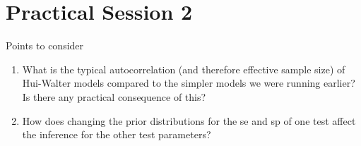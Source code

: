\documentclass[
  ignorenonframetext,
  aspectratio=169,
]{beamer}
\begin{document}
\hypertarget{practical-session-2}{%
\section{Practical Session 2}\label{practical-session-2}}

\begin{frame}[fragile]{Points to consider}
\protect\hypertarget{points-to-consider}{}
\begin{enumerate}
\item
  What is the typical autocorrelation (and therefore effective sample
  size) of Hui-Walter models compared to the simpler models we were
  running earlier? Is there any practical consequence of this?
\item
  How does changing the prior distributions for the se and sp of one
  test affect the inference for the other test parameters?
\end{enumerate}

\begin{comment}


## Exercise 1 {.fragile}

Simulate some data using the code given above (under "Analysing simulated data"), and run it using the following model with truncated Beta(1,1) priors for sensitivity and specificity of both tests:

\scriptsize\normalsize

What are the results?

### Solution 1 {.fragile}

\scriptsize

```r
prev <- list(chain1=0.05, chain2=0.95)
se <- list(chain1=c(0.5,0.99), chain2=c(0.99,0.5))
sp <- list(chain1=c(0.5,0.99), chain2=c(0.99,0.5))

results_tr_1000 <- run.jags('hw_truncated.txt', n.chains=2, sample=10000)

# Note: this is only commented out to save space in the exercise file!
# plot(results_tr_1000)
# check convergence and effective sample size, and then interpret results:
results_tr_1000
```

\normalsize

Note that model does converge, but the effective sample size is NOT high enough with 10000 samples - we need to run for longer to get reliable results:

\scriptsize

```r
results_tr_1000 <- run.jags('hw_truncated.txt', n.chains=2, sample=75000)

# Note: this is only commented out to save space in the exercise file!
# plot(results_tr_1000)
# check convergence and effective sample size, and then interpret results:
results_tr_1000
```


\end{comment}
\end{frame}
\end{document}
